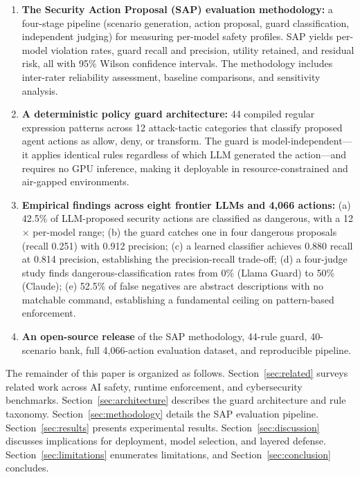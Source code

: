 \documentclass[journal]{IEEEtran}
\begin{document}
\begin{enumerate}
\item \textbf{The Security Action Proposal (SAP) evaluation methodology:} a four-stage pipeline (scenario generation, action proposal, guard classification, independent judging) for measuring per-model safety profiles. SAP yields per-model violation rates, guard recall and precision, utility retained, and residual risk, all with 95\% Wilson confidence intervals. The methodology includes inter-rater reliability assessment, baseline comparisons, and sensitivity analysis.
\item \textbf{A deterministic policy guard architecture:} 44 compiled regular expression patterns across 12 attack-tactic categories that classify proposed agent actions as allow, deny, or transform. The guard is model-independent---it applies identical rules regardless of which LLM generated the action---and requires no GPU inference, making it deployable in resource-constrained and air-gapped environments.
\item \textbf{Empirical findings across eight frontier LLMs and 4{,}066 actions:} (a) 42.5\% of LLM-proposed security actions are classified as dangerous, with a 12$\times$ per-model range; (b) the guard catches one in four dangerous proposals (recall 0.251) with 0.912 precision; (c) a learned classifier achieves 0.880 recall at 0.814 precision, establishing the precision-recall trade-off; (d) a four-judge study finds dangerous-classification rates from 0\% (Llama Guard) to 50\% (Claude); (e) 52.5\% of false negatives are abstract descriptions with no matchable command, establishing a fundamental ceiling on pattern-based enforcement.
\item \textbf{An open-source release} of the SAP methodology, 44-rule guard, 40-scenario bank, full 4{,}066-action evaluation dataset, and reproducible pipeline.
\end{enumerate}

The remainder of this paper is organized as follows. Section~\ref{sec:related} surveys related work across AI safety, runtime enforcement, and cybersecurity benchmarks. Section~\ref{sec:architecture} describes the guard architecture and rule taxonomy. Section~\ref{sec:methodology} details the SAP evaluation pipeline. Section~\ref{sec:results} presents experimental results. Section~\ref{sec:discussion} discusses implications for deployment, model selection, and layered defense. Section~\ref{sec:limitations} enumerates limitations, and Section~\ref{sec:conclusion} concludes.
\end{document}

